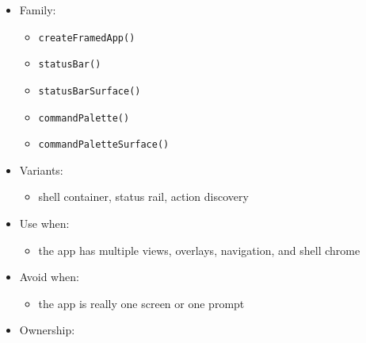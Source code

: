 \begin{itemize}
\tightlist
\item
  Family:

  \begin{itemize}
  \tightlist
  \item
    \texttt{c\allowbreak{}r\allowbreak{}e\allowbreak{}a\allowbreak{}t\allowbreak{}e\allowbreak{}F\allowbreak{}r\allowbreak{}a\allowbreak{}m\allowbreak{}e\allowbreak{}d\allowbreak{}A\allowbreak{}p\allowbreak{}p\allowbreak{}(\allowbreak{})}
  \item
    \texttt{s\allowbreak{}t\allowbreak{}a\allowbreak{}t\allowbreak{}u\allowbreak{}s\allowbreak{}B\allowbreak{}a\allowbreak{}r\allowbreak{}(\allowbreak{})}
  \item
    \texttt{s\allowbreak{}t\allowbreak{}a\allowbreak{}t\allowbreak{}u\allowbreak{}s\allowbreak{}B\allowbreak{}a\allowbreak{}r\allowbreak{}S\allowbreak{}u\allowbreak{}r\allowbreak{}f\allowbreak{}a\allowbreak{}c\allowbreak{}e\allowbreak{}(\allowbreak{})}
  \item
    \texttt{c\allowbreak{}o\allowbreak{}m\allowbreak{}m\allowbreak{}a\allowbreak{}n\allowbreak{}d\allowbreak{}P\allowbreak{}a\allowbreak{}l\allowbreak{}e\allowbreak{}t\allowbreak{}t\allowbreak{}e\allowbreak{}(\allowbreak{})}
  \item
    \texttt{c\allowbreak{}o\allowbreak{}m\allowbreak{}m\allowbreak{}a\allowbreak{}n\allowbreak{}d\allowbreak{}P\allowbreak{}a\allowbreak{}l\allowbreak{}e\allowbreak{}t\allowbreak{}t\allowbreak{}e\allowbreak{}S\allowbreak{}u\allowbreak{}r\allowbreak{}f\allowbreak{}a\allowbreak{}c\allowbreak{}e\allowbreak{}(\allowbreak{})}
  \end{itemize}
\item
  Variants:

  \begin{itemize}
  \tightlist
  \item
    shell container, status rail, action discovery
  \end{itemize}
\item
  Use when:

  \begin{itemize}
  \tightlist
  \item
    the app has multiple views, overlays, navigation, and shell chrome
  \end{itemize}
\item
  Avoid when:

  \begin{itemize}
  \tightlist
  \item
    the app is really one screen or one prompt
  \end{itemize}
\item
  Ownership:


\end{itemize}
